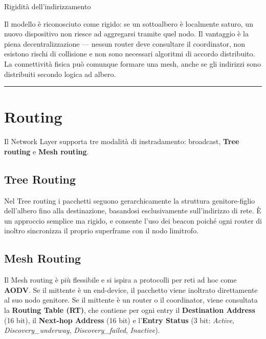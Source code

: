 \documentclass[
  italian,
  openany]{book}
\begin{document}
\begin{calloutwarning}{Rigidità dell’indirizzamento}

Il modello è riconosciuto come rigido: se un sottoalbero è localmente
saturo, un nuovo dispositivo non riesce ad aggregarsi tramite quel nodo.
Il vantaggio è la piena decentralizzazione --- nessun router deve
consultare il coordinator, non esistono rischi di collisione e non sono
necessari algoritmi di accordo distribuito. La connettività fisica può
comunque formare una mesh, anche se gli indirizzi sono distribuiti
secondo logica ad albero.

\end{calloutwarning}

\begin{center}\rule{0.5\linewidth}{0.5pt}\end{center}

\section{Routing}\label{routing}

Il Network Layer supporta tre modalità di instradamento: broadcast,
\textbf{Tree routing} e \textbf{Mesh routing}.

\subsection{Tree Routing}\label{tree-routing}

Nel Tree routing i pacchetti seguono gerarchicamente la struttura
genitore-figlio dell'albero fino alla destinazione, basandosi
esclusivamente sull'indirizzo di rete. È un approccio semplice ma
rigido, e consente l'uso dei beacon poiché ogni router di inoltro
sincronizza il proprio superframe con il nodo limitrofo.

\subsection{Mesh Routing}\label{mesh-routing}

Il Mesh routing è più flessibile e si ispira a protocolli per reti ad
hoc come \textbf{AODV}. Se il mittente è un end-device, il pacchetto
viene inoltrato direttamente al suo nodo genitore. Se il mittente è un
router o il coordinator, viene consultata la \textbf{Routing Table
(RT)}, che contiene per ogni entry il \textbf{Destination Address} (16
bit), il \textbf{Next-hop Address} (16 bit) e l'\textbf{Entry Status} (3
bit: \emph{Active}, \emph{Discovery\_underway},
\emph{Discovery\_failed}, \emph{Inactive}).
\end{document}
